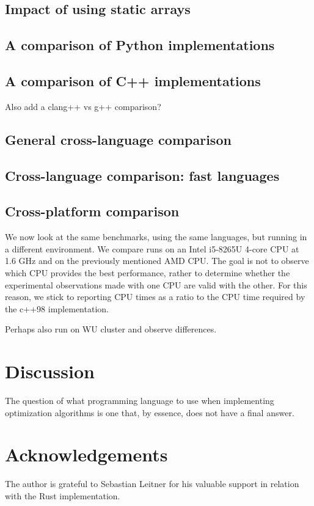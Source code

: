 \documentclass[11pt,a4paper,notitlepage]{article}
\begin{document}
\subsection{Impact of using static arrays}
\subsection{A comparison of Python implementations}
\subsection{A comparison of C++ implementations}
Also add a clang++ vs g++ comparison?
\subsection{General cross-language comparison}
\subsection{Cross-language comparison: fast languages}

\subsection{Cross-platform comparison}
We now look at the same benchmarks, using the same languages, but running
in a different environment. We compare runs on an Intel i5-8265U
4-core CPU at 1.6 GHz and on the previously mentioned AMD CPU. The
goal is not to observe which CPU provides the best performance, rather
to determine whether the experimental observations made with one CPU
are valid with the other. For this reason, we stick to reporting CPU
times as a ratio to the CPU time required by the c++98 implementation.

Perhaps also run on WU cluster and observe differences.

\section{Discussion}
The question of what programming language to use when implementing
optimization algorithms is one that, by essence, does not have a final
answer.

\section*{Acknowledgements}
The author is grateful to Sebastian Leitner for his valuable support
in relation with the Rust implementation.



\end{document}
